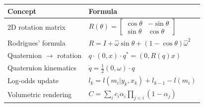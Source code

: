 \documentclass[12pt, a4paper]{article}
\begin{document}
\begin{center}
\renewcommand{\arraystretch}{1.6}
\begin{tabular}{ll}
\hline
\textbf{Concept} & \textbf{Formula} \\
\hline
2D rotation matrix & $R(\theta)=\begin{bmatrix}\cos\theta&-\sin\theta\\\sin\theta&\cos\theta\end{bmatrix}$ \\
Rodrigues' formula & $R = I+\hat\omega\sin\theta+(1-\cos\theta)\hat\omega^2$ \\
Quaternion $\to$ rotation & $q\cdot(0,x)\cdot q^*=(0,R(q)x)$ \\
Quaternion kinematics & $\dot q=\tfrac12(0,\omega)\cdot q$ \\
Log-odds update & $l_k = l(m_i|y_k,x_k)+l_{k-1}-l(m_i)$ \\
Volumetric rendering & $C=\sum_i c_i\alpha_i\prod_{j<i}(1-\alpha_j)$ \\
\hline
\end{tabular}
\end{center}
\end{document}
